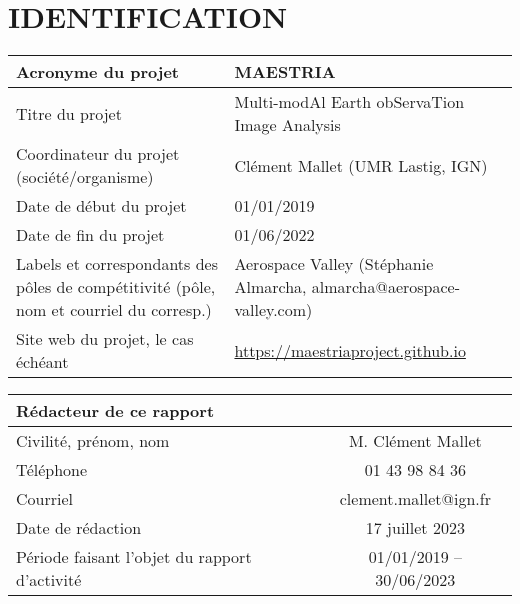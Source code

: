 \section{IDENTIFICATION}
\label{sec:identification}


\begin{table}[htbp]
    \centering
    \begin{tabular}{|p{6.5cm}|p{8.5cm}|}
    \hline
   \cellcolor{gris}\textbf{ Acronyme du projet} &\cellcolor{gris} \textbf{MAESTRIA} \\
        \hline
Titre du projet &
Multi-modAl Earth obServaTion Image Analysis \\
    \hline

Coordinateur du projet (société/organisme)&
Clément Mallet (UMR Lastig, IGN) \\
    \hline

Date de début du projet & 01/01/2019 \\
Date de fin du projet & 01/06/2022 \\
    \hline

Labels et correspondants des pôles de compétitivité 
(pôle, nom et courriel du corresp.) &
Aerospace Valley (Stéphanie Almarcha, almarcha@aerospace-valley.com)\\
    \hline

Site web du projet, le cas échéant &
\href{https://maestriaproject.github.io/maestria.github.io/}{https://maestriaproject.github.io} \\
    \hline

    \end{tabular}
    \label{tab:my_label}
\end{table}
\begin{table}[htbp]
    \centering
    \begin{tabular}{|p{6.5cm}|c|}
        \hline

\multicolumn{2}{|l|}{\cellcolor{gris}\textbf{Rédacteur de ce rapport}} \\       \hline
Civilité, prénom, nom & 
M. Clément Mallet \\    \hline
Téléphone &
01 43 98 84 36 \\    \hline
Courriel &
clement.mallet@ign.fr \\     \hline
Date de rédaction &
17 juillet 2023 \\     \hline
Période faisant l’objet du rapport d’activité &
01/01/2019 – 30/06/2023 \\    \hline


    \end{tabular}
    \label{tab:my_label2}
\end{table}